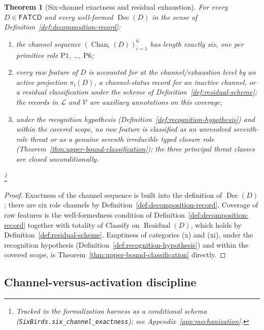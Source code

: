 \documentclass[11pt]{article}
\newtheorem{theorem}{Theorem}[section]
\theoremstyle{definition}
\newcommand{\FATCD}{\ensuremath{\mathsf{FATCD}}}
\newcommand{\Dec}[1]{\ensuremath{\operatorname{Dec}\!\left(#1\right)}}
\newcommand{\Residual}[1]{\ensuremath{\operatorname{Residual}\!\left(#1\right)}}
\newcommand{\Chan}[2]{\ensuremath{\operatorname{Chan}_{#1}\!\left(#2\right)}}
\newcommand{\Pone}{\ensuremath{\mathrm{P1}}}
\newcommand{\Psix}{\ensuremath{\mathrm{P6}}}
\begin{document}
\begin{theorem}[Six-channel exactness and residual exhaustion]\label{thm:six-channel-exactness}
For every \(D \in \FATCD{}\) and every well-formed
\(\Dec{D}\) in the sense of
Definition~\ref{def:decomposition-record}:
\begin{enumerate}[label=(\roman*),topsep=2pt,itemsep=1pt]
  \item the channel sequence \((\Chan{i}{D})_{i=1}^{6}\) has length
    exactly six, one per primitive role \Pone{}, \ldots, \Psix{};
  \item every raw feature of \(D\) is accounted for at the
    channel/exhaustion level by an active projection \(\pi_i(D)\), a
    channel-status record for an inactive channel, or a residual
    classification under the scheme of
    Definition~\ref{def:residual-scheme}; the records in \(\mathcal{L}\)
    and \(\mathcal{V}\) are auxiliary annotations on this coverage;
  \item under the recognition hypothesis
    (Definition~\ref{def:recognition-hypothesis}) and within the covered scope,
    no raw feature is classified as an unresolved seventh-role threat or as a
    genuine seventh irreducible typed closure role
    (Theorem~\ref{thm:upper-bound-classification}); the three principal threat
    classes are closed unconditionally.
\end{enumerate}\footnote{Tracked in the formalization harness as a conditional schema (\texttt{SixBirds.six\_channel\_exactness}); see Appendix~\ref{app:mechanization}.}
\end{theorem}

\begin{proof}
Exactness of the channel sequence is built into the definition of
\(\Dec{D}\); there are six role channels by
Definition~\ref{def:decomposition-record}. Coverage of raw features is
the well-formedness condition of
Definition~\ref{def:decomposition-record} together with totality of
\(\mathrm{Classify}\) on \(\Residual{D}\), which holds by
Definition~\ref{def:residual-scheme}. Emptiness of categories (x) and (xi),
under the recognition hypothesis (Definition~\ref{def:recognition-hypothesis})
and within the covered scope, is
Theorem~\ref{thm:upper-bound-classification} directly.
\end{proof}

\subsection{Channel-versus-activation discipline}\label{subsec:channel-vs-activation}
\end{document}
